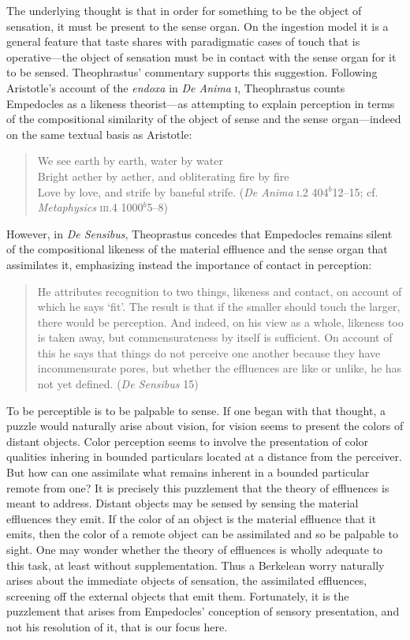 \documentclass[12pt]{article}
\begin{document}
The underlying thought is that in order for something to be the object of sensation, it must be present to the sense organ. On the ingestion model it is a general feature that taste shares with paradigmatic cases of touch that is operative---the object of sensation must be in contact with the sense organ for it to be sensed. Theophrastus' commentary supports this suggestion. Following Aristotle's account of the \emph{endoxa} in \emph{De Anima} \textsc{i}, Theophrastus counts Empedocles as a likeness theorist---as attempting to explain perception in terms of the compositional similarity of the object of sense and the sense organ---indeed on the same textual basis as Aristotle:
\begin{quote}
    We see earth by earth, water by water\\ 
    Bright aether by aether, and obliterating fire by fire\\ 
    Love by love, and strife by baneful strife. (\emph{De Anima} \textsc{i}.2 404\( ^{b} \)12--15; cf. \emph{Metaphysics} \textsc{iii}.4 1000\( ^{b} \)5--8)
\end{quote}
However, in \emph{De Sensibus}, Theoprastus concedes that Empedocles remains silent of the compositional likeness of the material effluence and the sense organ that assimilates it, emphasizing instead the importance of contact in perception:
\begin{quote}
    He attributes recognition to two things, likeness and contact, on account of which he says ‘fit’. The result is that if the smaller should touch the larger, there would be perception. And indeed, on his view as a whole, likeness too is taken away, but commensurateness by itself is sufficient. On account of this he says that things do not perceive one another because they have incommensurate pores, but whether the effluences are like or unlike, he has not yet defined. (\emph{De Sensibus} 15)
\end{quote}

To be perceptible is to be palpable to sense. If one began with that thought, a puzzle would naturally arise about vision, for vision seems to present the colors of distant objects. Color perception seems to involve the presentation of color qualities inhering in bounded particulars located at a distance from the perceiver. But how can one assimilate what remains inherent in a bounded particular remote from one? It is precisely this puzzlement that the theory of effluences is meant to address. Distant objects may be sensed by sensing the material effluences they emit. If the color of an object is the material effluence that it emits, then the color of a remote object can be assimilated and so be palpable to sight. One may wonder whether the theory of effluences is wholly adequate to this task, at least without supplementation. Thus a Berkelean worry naturally arises about the immediate objects of sensation, the assimilated effluences, screening off the external objects that emit them. Fortunately, it is the puzzlement that arises from Empedocles' conception of sensory presentation, and not his resolution of it, that is our focus here. 
\end{document}
